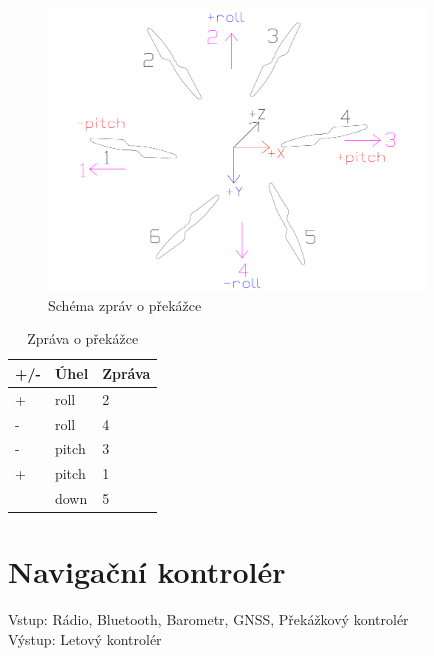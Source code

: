 \begin{figure}[H]
	\centering
	\includegraphics[width=10cm]{pictures/obstacle_teo.pdf}
	\caption{Schéma zpráv o překážce}
\end{figure}

\begin{table}[H]
	\centering
	\begin{tabular}{|l|l|l|}
		\hline
		\textbf{+/-} & \textbf{Úhel} & \textbf{Zpráva} \\ \hline
		+            & roll          & 2               \\ \hline
		-            & roll          & 4               \\ \hline
		-            & pitch         & 3               \\ \hline
		+            & pitch         & 1               \\ \hline
		& down          & 5               \\ \hline
	\end{tabular}
	\caption{Zpráva o překážce}
\end{table}

\section{Navigační kontrolér} 
Vstup: Rádio, Bluetooth, Barometr, GNSS, Překážkový kontrolér\\
Výstup: Letový kontrolér\\


